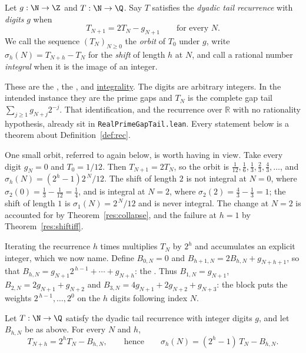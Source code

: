 \documentclass[11pt]{article}
\begin{document}
\begin{definition}\label{def:rec}
Let $g:\N\to\Z$ and $T:\N\to\Q$.  Say $T$ satisfies the \emph{dyadic tail
recurrence} with \emph{digits} $g$ when
\[
 T_{N+1}=2T_N-g_{N+1}\qquad\text{for every }N .
\]
We call the sequence $(T_N)_{N\ge0}$ the \emph{orbit} of $T_0$ under $g$,
write $\sigma_h(N)=T_{N+h}-T_N$ for the \emph{shift} of length $h$ at $N$, and
call a rational number \emph{integral} when it is the image of an integer.
\end{definition}

\noindent These are the
, the
, and
\href{https://github.com/wcook04/plectis-erdos/blob/99f4bf47422abbd8757cbb22b50ba079d764d3a7/ErdosProblems/Erdos251/PrimeGapDyadicTail.lean#L575}{integrality}.
The digits are arbitrary integers.  In the intended instance they are the prime
gaps and $T_N$ is the complete gap tail $\sum_{j\ge1}g_{N+j}2^{-j}$.  That
identification, and the recurrence over $\mathbb R$ with no rationality
hypothesis, already sit in \texttt{RealPrimeGapTail.lean}.  Every statement
below is a theorem about Definition~\ref{def:rec}.

One small orbit, referred to again below, is worth having in view.  Take every
digit $g_N=0$ and $T_0=1/12$.  Then $T_{N+1}=2T_N$, so the orbit is
$\tfrac1{12},\tfrac16,\tfrac13,\tfrac23,\tfrac43,\ldots$, and
$\sigma_h(N)=(2^{h}-1)2^{\,N}/12$.  The shift of length $2$ is not integral at
$N=0$, where $\sigma_2(0)=\tfrac13-\tfrac1{12}=\tfrac14$, and is integral at
$N=2$, where $\sigma_2(2)=\tfrac43-\tfrac13=1$; the shift of length $1$ is
$\sigma_1(N)=2^{\,N}/12$ and is never integral.  The change at $N=2$ is
accounted for by Theorem~\ref{res:collapse}, and the failure at $h=1$ by
Theorem~\ref{res:shiftiff}.

Iterating the recurrence $h$ times multiplies $T_N$ by $2^{h}$ and accumulates
an explicit integer, which we now name.  Define
$B_{0,N}=0$ and $B_{h+1,N}=2B_{h,N}+g_{N+h+1}$, so that
$B_{h,N}=g_{N+1}2^{\,h-1}+\cdots+g_{N+h}$: the
.
Thus $B_{1,N}=g_{N+1}$, $B_{2,N}=2g_{N+1}+g_{N+2}$ and
$B_{3,N}=4g_{N+1}+2g_{N+2}+g_{N+3}$: the block puts the weights
$2^{\,h-1},\ldots,2^{0}$ on the $h$ digits following index $N$.

\begin{theorem}\label{res:block}
Let $T:\N\to\Q$ satisfy the dyadic tail recurrence with integer digits $g$, and
let $B_{h,N}$ be as above.  For every $N$ and $h$,
\[
 T_{N+h}=2^{h}T_N-B_{h,N},
 \qquad\text{hence}\qquad
 \sigma_h(N)=(2^{h}-1)\,T_N-B_{h,N} .
\]
\end{theorem}
\end{document}

